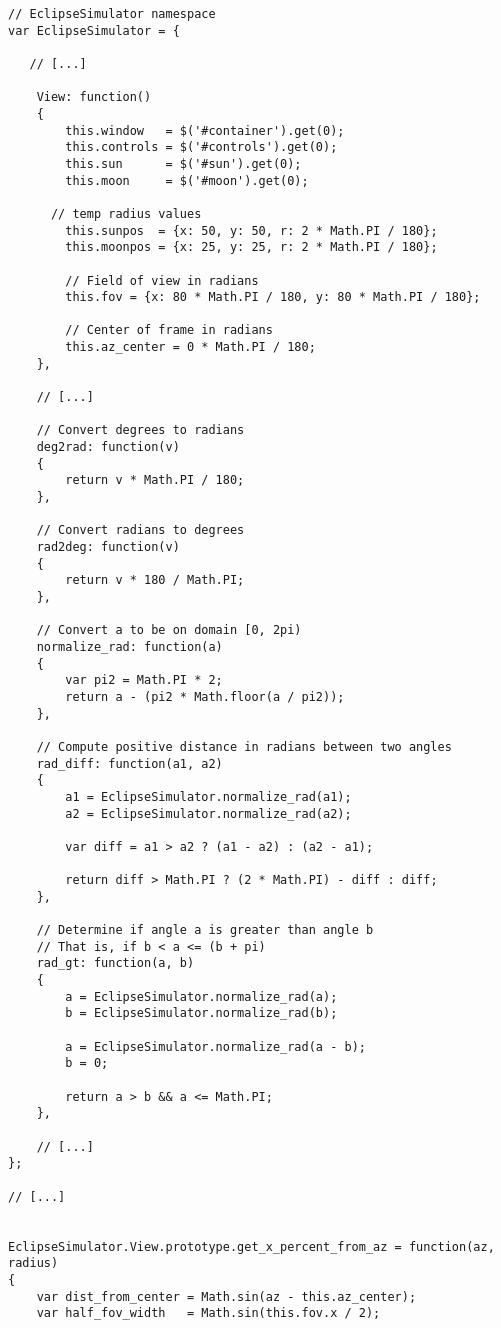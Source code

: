 \documentclass[10pt, onecolumn, draftclsnofoot, letterpaper, compsoc]{IEEEtran}
\begin{document}
\begin{verbatim}
// EclipseSimulator namespace
var EclipseSimulator = {

   // [...]

    View: function()
    {
        this.window   = $('#container').get(0);
        this.controls = $('#controls').get(0);
        this.sun      = $('#sun').get(0);
        this.moon     = $('#moon').get(0);

      // temp radius values
        this.sunpos  = {x: 50, y: 50, r: 2 * Math.PI / 180};
        this.moonpos = {x: 25, y: 25, r: 2 * Math.PI / 180};

        // Field of view in radians
        this.fov = {x: 80 * Math.PI / 180, y: 80 * Math.PI / 180};

        // Center of frame in radians
        this.az_center = 0 * Math.PI / 180;
    },

    // [...]

    // Convert degrees to radians
    deg2rad: function(v)
    {
        return v * Math.PI / 180;
    },

    // Convert radians to degrees
    rad2deg: function(v)
    {
        return v * 180 / Math.PI;
    },

    // Convert a to be on domain [0, 2pi)
    normalize_rad: function(a)
    {
        var pi2 = Math.PI * 2;
        return a - (pi2 * Math.floor(a / pi2));
    },

    // Compute positive distance in radians between two angles
    rad_diff: function(a1, a2)
    {
        a1 = EclipseSimulator.normalize_rad(a1);
        a2 = EclipseSimulator.normalize_rad(a2);

        var diff = a1 > a2 ? (a1 - a2) : (a2 - a1);

        return diff > Math.PI ? (2 * Math.PI) - diff : diff;
    },

    // Determine if angle a is greater than angle b
    // That is, if b < a <= (b + pi)
    rad_gt: function(a, b)
    {
        a = EclipseSimulator.normalize_rad(a);
        b = EclipseSimulator.normalize_rad(b);

        a = EclipseSimulator.normalize_rad(a - b);
        b = 0;

        return a > b && a <= Math.PI;
    },

    // [...]
};

// [...]


EclipseSimulator.View.prototype.get_x_percent_from_az = function(az, radius)
{
    var dist_from_center = Math.sin(az - this.az_center);
    var half_fov_width   = Math.sin(this.fov.x / 2);


\end{verbatim}
\end{document}
